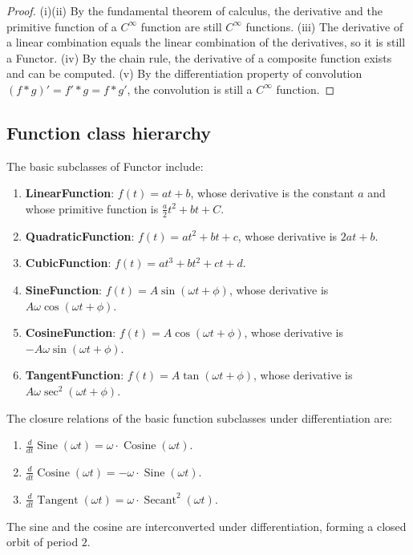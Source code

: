 \begin{proof}
(i)(ii) By the fundamental theorem of calculus, the derivative and the primitive function of a $C^\infty$ function are still $C^\infty$ functions.
(iii) The derivative of a linear combination equals the linear combination of the derivatives, so it is still a Functor.
(iv) By the chain rule, the derivative of a composite function exists and can be computed.
(v) By the differentiation property of convolution $(f * g)' = f' * g = f * g'$, the convolution is still a $C^\infty$ function.
\end{proof}

\subsection{Function class hierarchy}

\begin{definition}\label{def:basic_function_subclasses}
The basic subclasses of Functor include:
\begin{enumerate}[label=(\roman*)]
    \item \textbf{LinearFunction}: $f(t) = at + b$, whose derivative is the constant $a$ and whose primitive function is $\frac{a}{2}t^2 + bt + C$.
    \item \textbf{QuadraticFunction}: $f(t) = at^2 + bt + c$, whose derivative is $2at + b$.
    \item \textbf{CubicFunction}: $f(t) = at^3 + bt^2 + ct + d$.
    \item \textbf{SineFunction}: $f(t) = A\sin(\omega t + \phi)$, whose derivative is $A\omega\cos(\omega t + \phi)$.
    \item \textbf{CosineFunction}: $f(t) = A\cos(\omega t + \phi)$, whose derivative is $-A\omega\sin(\omega t + \phi)$.
    \item \textbf{TangentFunction}: $f(t) = A\tan(\omega t + \phi)$, whose derivative is $A\omega\sec^2(\omega t + \phi)$.
\end{enumerate}
\end{definition}

\begin{proposition}\label{prop:basic_function_derivative_closure}
The closure relations of the basic function subclasses under differentiation are:
\begin{enumerate}[label=(\roman*)]
    \item $\frac{d}{dt}\operatorname{Sine}(\omega t) = \omega \cdot \operatorname{Cosine}(\omega t)$.
    \item $\frac{d}{dt}\operatorname{Cosine}(\omega t) = -\omega \cdot \operatorname{Sine}(\omega t)$.
    \item $\frac{d}{dt}\operatorname{Tangent}(\omega t) = \omega \cdot \operatorname{Secant}^2(\omega t)$.
\end{enumerate}
The sine and the cosine are interconverted under differentiation, forming a closed orbit of period $2$.
\end{proposition}

